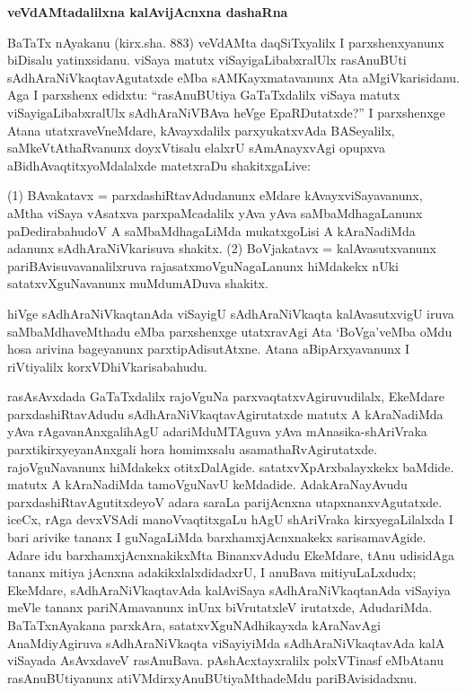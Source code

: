\bigskip
\begin{center}
{\Large\bf veVdAMtadalilxna kalAvijAcnxna dashaRna}
\end{center}

BaTaTx nAyakanu (kirx.sha. 883) veVdAMta daqSiTxyalilx I parxshenxyanunx biDisalu yatinxsidanu. viSaya matutx viSayigaLibabxralUlx rasAnuBUti sAdhAraNiVkaqtavAgutatxde eMba sAMKayxmatavanunx Ata aMgiVkarisidanu. Aga I parxshenx edidxtu: ``rasAnuBUtiya GaTaTxdalilx viSaya matutx viSayigaLibabxralUlx sAdhAraNiVBAva heVge EpaRDutatxde?'' I parxshenxge Atana utatxraveVneMdare, kAvayxdalilx parxyukatxvAda BASeyalilx, saMkeVtAthaRvanunx doyxVtisalu elalxrU sAmAnayxvAgi opupxva aBidhAvaqtitxyoMdalalxde matetxraDu shakitx\-gaLive:

(1) BAvakatavx = parxdashiRtavAdudanunx eMdare kAvayxviSayavanunx, aMtha viSaya vAsatxva parxpaMcadalilx yAva yAva saMbaMdhagaLanunx paDedirabahudoV A saMbaMdhagaLiMda mukatxgoLisi A kAraNadiMda adanunx sAdhAraNiVkarisuva shakitx. (2) BoVjakatavx = kalAvasutxvanunx pariBAvisuvavanalilxruva rajasatxmoVguNagaLanunx hiMdakekx nUki satatxvXguNavanunx muMdumADuva shakitx.

hiVge sAdhAraNiVkaqtanAda viSayigU sAdhAraNiVkaqta kalAvasutxvigU iruva saMbaMdhaveMthadu eMba parxshenxge utatxravAgi Ata `BoVga'veMba oMdu hosa arivina bageyanunx parxtipAdisutAtxne. Atana aBipArxyavanunx I riVtiyalilx korxVDhiVkarisabahudu.

rasAsAvxdada GaTaTxdalilx rajoVguNa parxvaqtatxvAgiruvudilalx, EkeMdare parxdashiRta\break\-vAdudu sAdhAraNiVkaqtavAgirutatxde matutx A kAraNadiMda yAva rAgavanAnxgali\break hAgU adariMduMTAguva yAva mAnasika-shAriVraka parxtikirxyeyanAnxgali hora homimxsalu asamathaRvAgirutatxde. rajoVguNavanunx hiMdakekx otitxDalAgide. satatxvX\break pArxbalayxkekx baMdide. matutx A kAraNadiMda tamoVguNavU keMdadide. AdakAraNa\break yAvudu parxdashiRtavAgutitxdeyoV adara saraLa parijAcnxna utapxnanxvAgutatxde. iceCx, rAga devxVSAdi manoVvaqtitxgaLu hAgU shAriVraka kirxyegaLilalxda I bari arivike tananx I guNagaLiMda barxhamxjAcnxnakekx sarisamavAgide. Adare idu barxhamxjAcnxnakikxMta BinanxvAdudu EkeMdare, tAnu udisidAga tananx mitiya jAcnxna adakikxlalxdidadxrU, I anuBava miti\-yuLaLxdudx; EkeMdare, sAdhAraNiVkaqtavAda kalAviSaya sAdhAraNiVkaqtanAda viSayiya meVle tananx pariNAmavanunx inUnx biVrutatxleV irutatxde, AdudariMda. BaTaTxnAyakana parxkAra, satatxvXguNAdhikayxda kAraNavAgi AnaMdiyAgiruva sAdhAraNiVkaqta viSayi\-yiMda sAdhAraNiVkaqtavAda kalA viSayada AsAvxdaveV rasAnuBava. pAshAcxtayxralilx polxVTinasf eMbAtanu rasAnuBUtiyanunx atiVMdirxyAnuBUtiyaMthadeMdu pariBAvisidadxnu.


